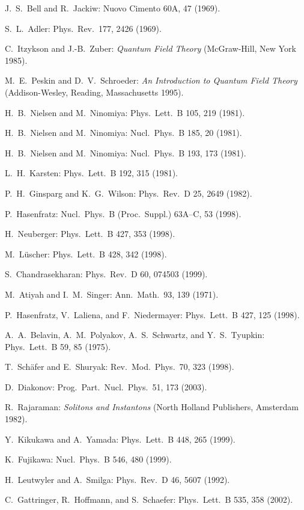 \begin{enumerate}[label={[\arabic*]}]
  \item J.~S.~Bell and R.~Jackiw: Nuovo Cimento 60A, 47 (1969).
  \item S.~L.~Adler: Phys.~Rev.~177, 2426 (1969).
  \item C.~Itzykson and J.-B.~Zuber: \emph{Quantum Field Theory} (McGraw-Hill,
        New York 1985).
  \item M.~E.~Peskin and D.~V.~Schroeder: \emph{An Introduction to Quantum
        Field Theory} (Addison-Wesley, Reading, Massachusetts 1995).
  \item H.~B.~Nielsen and M.~Ninomiya: Phys.~Lett.~B 105, 219 (1981).
  \item H.~B.~Nielsen and M.~Ninomiya: Nucl.~Phys.~B 185, 20 (1981).
  \item H.~B.~Nielsen and M.~Ninomiya: Nucl.~Phys.~B 193, 173 (1981).
  \item L.~H.~Karsten: Phys.~Lett.~B 192, 315 (1981).
  \item P.~H.~Ginsparg and K.~G.~Wilson: Phys.~Rev.~D 25, 2649 (1982).
  \item P.~Hasenfratz: Nucl.~Phys.~B (Proc.~Suppl.) 63A--C, 53 (1998).
  \item H.~Neuberger: Phys.~Lett.~B 427, 353 (1998).
  \item M.~L\"uscher: Phys.~Lett.~B 428, 342 (1998).
  \item S.~Chandrasekharan: Phys.~Rev.~D 60, 074503 (1999).
  \item M.~Atiyah and I.~M.~Singer: Ann.~Math.~93, 139 (1971).
  \item P.~Hasenfratz, V.~Laliena, and F.~Niedermayer: Phys.~Lett.~B 427, 125 (1998).
  \item A.~A.~Belavin, A.~M.~Polyakov, A.~S.~Schwartz, and Y.~S.~Tyupkin:
        Phys.~Lett.~B 59, 85 (1975).
  \item T.~Sch\"afer and E.~Shuryak: Rev.~Mod.~Phys.~70, 323 (1998).
  \item D.~Diakonov: Prog.~Part.~Nucl.~Phys.~51, 173 (2003).
  \item R.~Rajaraman: \emph{Solitons and Instantons} (North Holland Publishers,
        Amsterdam 1982).
  \item Y.~Kikukawa and A.~Yamada: Phys.~Lett.~B 448, 265 (1999).
  \item K.~Fujikawa: Nucl.~Phys.~B 546, 480 (1999).
  \item H.~Leutwyler and A.~Smilga: Phys.~Rev.~D 46, 5607 (1992).
  \item C.~Gattringer, R.~Hoffmann, and S.~Schaefer: Phys.~Lett.~B 535, 358 (2002).

\end{enumerate}
